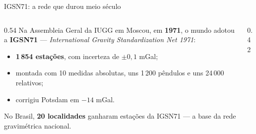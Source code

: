 \documentclass[aspectratio=169,11pt]{beamer}
\newcommand{\bnum}[1]{\textbf{\textcolor{mTeal}{#1}}}
\begin{document}
\begin{frame}{IGSN71: a rede que durou meio século}
  \begin{columns}[T]
    \begin{column}{0.54\textwidth}
      Na Assembleia Geral da IUGG em Moscou, em \bnum{1971}, o mundo adotou a
      \textbf{IGSN71} --- \emph{International Gravity Standardization Net 1971}:
      \begin{itemize}
        \item \bnum{1\,854 estações}, com incerteza de $\pm 0{,}1$ mGal;
        \item montada com 10 medidas absolutas, uns 1\,200 pêndulos e uns 24\,000 relativos;
        \item corrigiu Potsdam em $-14$ mGal.
      \end{itemize}
      No Brasil, \bnum{20 localidades} ganharam estações da IGSN71 --- a base da rede
      gravimétrica nacional.
    \end{column}
    \begin{column}{0.42\textwidth}
      \centering
    \end{column}
  \end{columns}
\end{frame}
\end{document}
